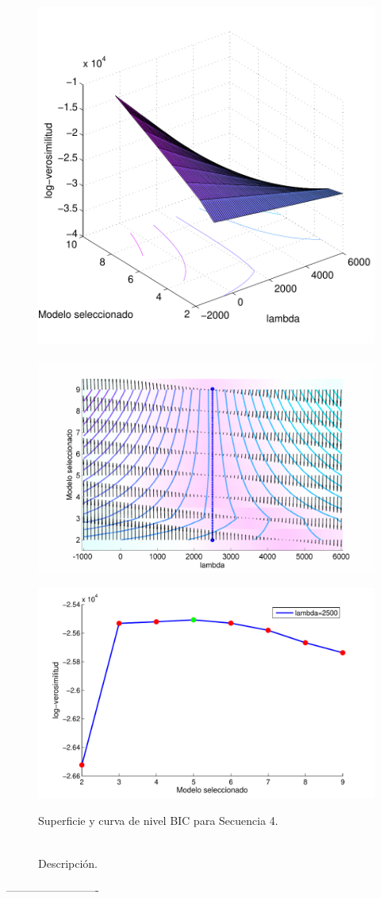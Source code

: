 \begin{figure}[H]
  \centerline  
  {\includegraphics[width=0.55\linewidth]{gfx/chap6/noctbic1} ~
   \includegraphics[width=0.5\linewidth]{gfx/chap6/noctbic2} }
  \centerline  
  {\includegraphics[width=0.4\linewidth]{gfx/chap6/noctbic3}
  } \quad
  \caption{Superficie y curva de nivel BIC para Secuencia 4.}
  \caption*{\\Descripción.}
  \label{fig:prb1_sup}
\end{figure}

-------------------------

